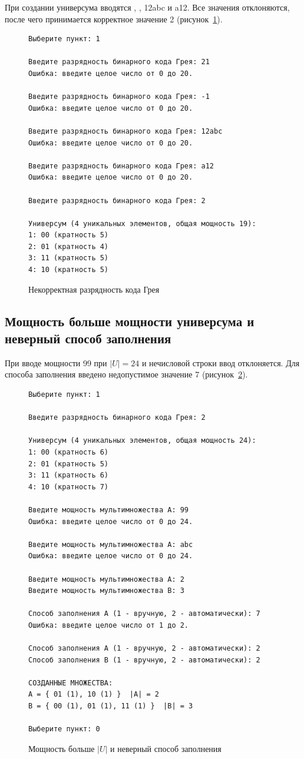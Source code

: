 \documentclass[14pt,a4paper]{extreport}
\newcommand{\card}[1]{\left|#1\right|}
\newcommand{\code}[1]{{\ttfamily #1}}
\begin{document}
При создании универсума вводятся \code{21}, \code{-1}, \code{12abc} и \code{a12}. Все значения отклоняются, после чего принимается корректное значение 2 (рисунок~\ref{fig:badbits}).

\begin{figure}[H]
\begin{lstlisting}[numbers=none,frame=single]
Выберите пункт: 1

Введите разрядность бинарного кода Грея: 21
Ошибка: введите целое число от 0 до 20.

Введите разрядность бинарного кода Грея: -1
Ошибка: введите целое число от 0 до 20.

Введите разрядность бинарного кода Грея: 12abc
Ошибка: введите целое число от 0 до 20.

Введите разрядность бинарного кода Грея: a12
Ошибка: введите целое число от 0 до 20.

Введите разрядность бинарного кода Грея: 2

Универсум (4 уникальных элементов, общая мощность 19):
1: 00 (кратность 5)
2: 01 (кратность 4)
3: 11 (кратность 5)
4: 10 (кратность 5)
\end{lstlisting}
\caption{Некорректная разрядность кода Грея}\label{fig:badbits}
\end{figure}

\subsection{Мощность больше мощности универсума и неверный способ заполнения}

При вводе мощности 99 при $\card{U}=24$ и нечисловой строки ввод отклоняется. Для способа заполнения введено недопустимое значение 7 (рисунок~\ref{fig:badpower}).

\begin{figure}[H]
\begin{lstlisting}[numbers=none,frame=single]
Выберите пункт: 1

Введите разрядность бинарного кода Грея: 2

Универсум (4 уникальных элементов, общая мощность 24):
1: 00 (кратность 6)
2: 01 (кратность 5)
3: 11 (кратность 6)
4: 10 (кратность 7)

Введите мощность мультимножества A: 99
Ошибка: введите целое число от 0 до 24.

Введите мощность мультимножества A: abc
Ошибка: введите целое число от 0 до 24.

Введите мощность мультимножества A: 2
Введите мощность мультимножества B: 3

Способ заполнения A (1 - вручную, 2 - автоматически): 7
Ошибка: введите целое число от 1 до 2.

Способ заполнения A (1 - вручную, 2 - автоматически): 2
Способ заполнения B (1 - вручную, 2 - автоматически): 2

СОЗДАННЫЕ МНОЖЕСТВА:
A = { 01 (1), 10 (1) }  |A| = 2
B = { 00 (1), 01 (1), 11 (1) }  |B| = 3

Выберите пункт: 0
\end{lstlisting}
\caption{Мощность больше $\card{U}$ и неверный способ заполнения}\label{fig:badpower}
\end{figure}
\end{document}
